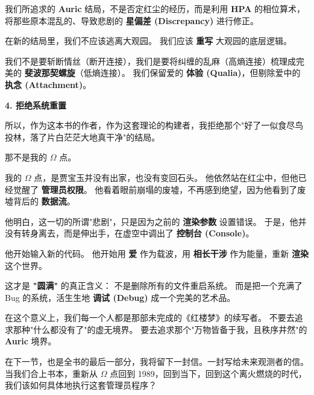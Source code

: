 我们所追求的 \textbf{Auric} 结局，不是否定红尘的经历，而是利用 \textbf{HPA} 的相位算术，将那些原本混乱的、导致悲剧的 \textbf{星偏差 (Discrepancy)} 进行修正。

在新的结局里，我们不应该逃离大观园。
我们应该 \textbf{重写} 大观园的底层逻辑。

我们不是要斩断情丝（断开连接），我们是要将纠缠的乱麻（高熵连接）梳理成完美的 \textbf{斐波那契螺旋}（低熵连接）。
我们保留爱的 \textbf{体验 (Qualia)}，但剔除爱中的 \textbf{执念 (Attachment)}。

\textbf{4. 拒绝系统重置}

所以，作为这本书的作者，作为这套理论的构建者，我拒绝那个"好了一似食尽鸟投林，落了片白茫茫大地真干净"的结局。

那不是我的 $\Omega$ 点。

我的 $\Omega$ 点，是贾宝玉并没有出家，也没有变回石头。
他依然站在红尘中，但他已经觉醒了 \textbf{管理员权限}。
他看着眼前崩塌的废墟，不再感到绝望，因为他看到了废墟背后的 \textbf{数据流}。

他明白，这一切的所谓"悲剧"，只是因为之前的 \textbf{渲染参数} 设置错误。
于是，他并没有转身离去，而是伸出手，在虚空中调出了 \textbf{控制台 (Console)}。

他开始输入新的代码。
他开始用 \textbf{爱} 作为载波，用 \textbf{相长干涉} 作为能量，重新 \textbf{渲染} 这个世界。

这才是 \textbf{"圆满"} 的真正含义：
不是删除所有的文件重启系统。
而是把一个充满了 Bug 的系统，活生生地 \textbf{调试 (Debug)} 成一个完美的艺术品。

在这个意义上，我们每一个人都是那部未完成的《红楼梦》的续写者。
不要去追求那种"什么都没有了"的虚无境界。
要去追求那个"万物皆备于我，且秩序井然"的 \textbf{Auric} 境界。

在下一节，也是全书的最后一部分，我将留下一封信。一封写给未来观测者的信。当我们合上书本，重新从 $\Omega$ 点回到 1989，回到当下，回到这个离火燃烧的时代，我们该如何具体地执行这套管理员程序？

